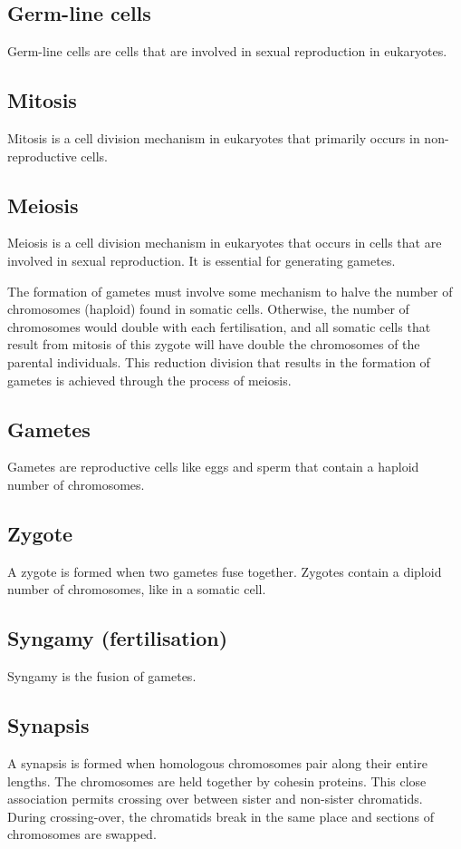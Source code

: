 \documentclass[11pt]{article}
\begin{document}
\subsection{Germ-line cells}
\label{sec:org0bc46ea}
Germ-line cells are cells that are involved in sexual reproduction in eukaryotes.
\subsection{Mitosis}
\label{sec:orge8c66c9}
Mitosis is a cell division mechanism in eukaryotes that primarily occurs in non-reproductive cells.
\subsection{Meiosis}
\label{sec:org0c160f3}
Meiosis is a cell division mechanism in eukaryotes that occurs in cells that are involved in sexual reproduction. It is essential for generating gametes.


The formation of gametes must involve some mechanism to halve the number of chromosomes (haploid) found in somatic cells. Otherwise, the number of chromosomes would double with each fertilisation, and all somatic cells that result from mitosis of this zygote will have double the chromosomes of the parental individuals. This reduction division that results in the formation of gametes is achieved through the process of meiosis.
\subsection{Gametes}
\label{sec:orgcd39fcf}
Gametes are reproductive cells like eggs and sperm that contain a haploid number of chromosomes.
\subsection{Zygote}
\label{sec:org1653370}
A zygote is formed when two gametes fuse together. Zygotes contain a diploid number of chromosomes, like in a somatic cell.
\subsection{Syngamy (fertilisation)}
\label{sec:org807641e}
Syngamy is the fusion of gametes.

\newpage
\subsection{Synapsis}
\label{sec:org85f12ee}
A synapsis is formed when homologous chromosomes pair along their entire lengths. The chromosomes are held together by cohesin proteins. This close association permits crossing over between sister and non-sister chromatids. During crossing-over, the chromatids break in the same place and sections of chromosomes are swapped.
\end{document}
